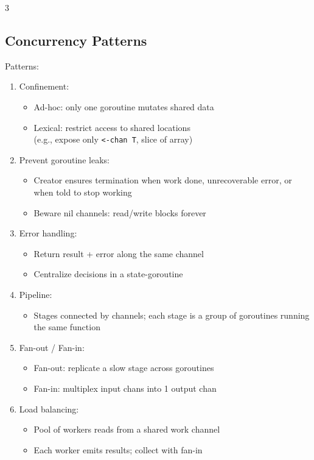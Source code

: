 \documentclass[12pt, a4paper]{article}
\begin{document}
\begin{multicols*}{3}
\subsection{Concurrency Patterns}
Patterns:
\begin{enumerate}[\roman*.]
  \item Confinement:
    \begin{itemize}[leftmargin=*]\vspace{3pt}
      \item Ad-hoc: only one goroutine mutates shared data
      \item Lexical: restrict access to shared locations\\(e.g., expose only \lstinline|<-chan T|, slice of array)
    \end{itemize}
  \item Prevent goroutine leaks:
    \begin{itemize}[leftmargin=*]\vspace{3pt}
      \item Creator ensures termination when work done, unrecoverable error, or when told to stop working 
      \item Beware nil channels: read/write blocks forever
    \end{itemize}
  \item Error handling:
    \begin{itemize}[leftmargin=*]\vspace{3pt}
      \item Return result + error along the same channel
      \item Centralize decisions in a state-goroutine
    \end{itemize}
  \item Pipeline:
    \begin{itemize}[leftmargin=*]\vspace{3pt}
      \item Stages connected by channels; each stage is a group of goroutines running the same function
    \end{itemize}
  \item Fan-out / Fan-in:
    \begin{itemize}[leftmargin=*]\vspace{3pt}
      \item Fan-out: replicate a slow stage across goroutines 
      \item Fan-in: multiplex input chans into 1 output chan
    \end{itemize}
\item Load balancing:
  \begin{itemize}[leftmargin=*]\vspace{3pt}
    \item Pool of workers reads from a shared work channel
    \item Each worker emits results; collect with fan-in
  \end{itemize}
\end{enumerate}
\vspace{-1em}
\colbreak

\end{multicols*}
\end{document}
